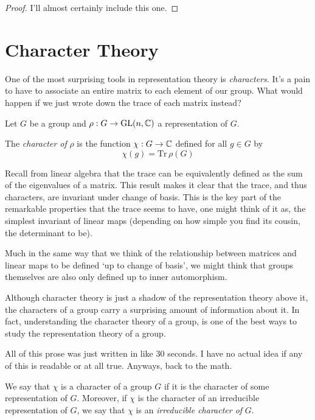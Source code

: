 \begin{proof}
    I'll almost certainly include this one.
\end{proof}


\section{Character Theory}

One of the most surprising tools in representation theory is \emph{characters}. It's a pain to have to associate an 
entire matrix to each element of our group. What would happen if we just wrote down the trace of each matrix 
instead?




\begin{definition}
    Let $G$ be a group and $\rho : G \rightarrow \operatorname{GL}(n, \mathbb{C})$ a representation of $G$. 

    The \emph{character of }$\rho$ is the function $\chi : G \rightarrow \mathbb{C}$ defined for all $g \in G$ by
    \[
        \chi(g) = \text{Tr}\,\rho(G)
    \]
\end{definition}

Recall from linear algebra that the trace can be equivalently defined as the sum of the eigenvalues of a matrix. 
This result makes it clear that the trace, and thus characters, are invariant under change of basis. This is the 
key part of the remarkable properties that the trace seems to have, one might think of it as, the simplest 
invariant of linear maps (depending on how simple you find its cousin, the determinant to be).


Much in the same way that we think of the relationship between matrices and linear maps to be defined `up to change 
of basis', we might think that groups themselves are also only defined up to inner automorphism.

Although character theory is just a shadow of the representation theory above it, the characters of a group carry a 
surprising amount of information about it. In fact, understanding the character theory of a group, is one of the 
best ways to study the representation theory of a group.

All of this prose was just written in like 30 seconds. I have no actual idea if any of this is readable or at all 
true. Anyways, back to the math.



\begin{definition}
    We say that $\chi$ is a character of a group $G$ if it is the character of some representation of $G$.
    Moreover, if $\chi$ is the character of an irreducible representation of $G$, we say that $\chi$ is an
    \emph{irreducible character of} $G$.
\end{definition}


